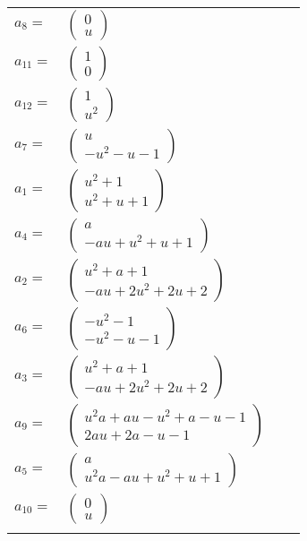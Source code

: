 \documentclass[1p]{elsarticle_modified}
\theoremstyle{definition}
\begin{document}
\begin{tabular}{m{7pt} m{180pt} m{7pt} m{180pt} }
\flushright $a_{8}=$&$\begin{pmatrix}0\\u\end{pmatrix}$ \\
\flushright $a_{11}=$&$\begin{pmatrix}1\\0\end{pmatrix}$ \\
\flushright $a_{12}=$&$\begin{pmatrix}1\\u^2\end{pmatrix}$ \\
\flushright $a_{7}=$&$\begin{pmatrix}u\\- u^2- u-1\end{pmatrix}$ \\
\flushright $a_{1}=$&$\begin{pmatrix}u^2+1\\u^2+u+1\end{pmatrix}$ \\
\flushright $a_{4}=$&$\begin{pmatrix}a\\- a u+u^2+u+1\end{pmatrix}$ \\
\flushright $a_{2}=$&$\begin{pmatrix}u^2+a+1\\- a u+2 u^2+2 u+2\end{pmatrix}$ \\
\flushright $a_{6}=$&$\begin{pmatrix}- u^2-1\\- u^2- u-1\end{pmatrix}$ \\
\flushright $a_{3}=$&$\begin{pmatrix}u^2+a+1\\- a u+2 u^2+2 u+2\end{pmatrix}$ \\
\flushright $a_{9}=$&$\begin{pmatrix}u^2 a+a u- u^2+a- u-1\\2 a u+2 a- u-1\end{pmatrix}$ \\
\flushright $a_{5}=$&$\begin{pmatrix}a\\u^2 a- a u+u^2+u+1\end{pmatrix}$ \\
\flushright $a_{10}=$&$\begin{pmatrix}0\\u\end{pmatrix}$\\&\end{tabular}
\end{document}
